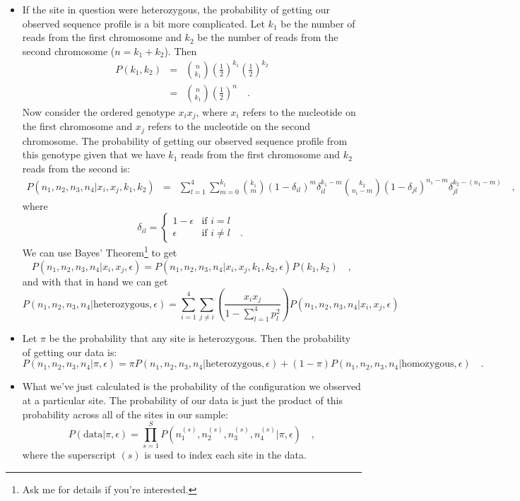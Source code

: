 \documentclass[12pt]{article}
\begin{document}
\begin{itemize}
\item If the site in question were heterozygous, the probability of
  getting our observed sequence profile is a bit more complicated. Let
  $k_1$ be the number of reads from the first chromosome and $k_2$ be
  the number of reads from the second chromosome ($n=k_1+k_2$). Then
\begin{eqnarray*}
P(k_1,k_2)
&=&
{n \choose k_1}\left(\frac{1}{2}\right)^{k_1}
               \left(\frac{1}{2}\right)^{k_2}
\\
&=&
{n \choose k_1}\left(\frac{1}{2}\right)^n \quad .
\end{eqnarray*}
Now consider the ordered genotype $x_ix_j$, where $x_i$ refers to the
nucleotide on the first chromosome and $x_j$ refers to the nucleotide
on the second chromosome. The probability of getting our observed
sequence profile from this genotype given that we have $k_1$ reads
from the first chromosome and $k_2$ reads from the second is:
{\footnotesize
\begin{eqnarray*}
P(n_1,n_2,n_3,n_4|x_i,x_j,k_1,k_2)
&=&
\sum_{l=1}^4\sum_{m=0}^{k_1}{k_1 \choose m}(1-\delta_{il})^m\delta_{il}^{k_1-m}
{k_2 \choose n_i-m}(1-\delta_{jl})^{n_1-m}\delta_{jl}^{k_2-(n_1-m)}
\quad ,
\end{eqnarray*}
}
where 
\[
\delta_{il} = \left\{\begin{array}{ll}
1-\epsilon & \mbox{if } i = l \\
\epsilon & \mbox{if } i \ne l \quad .
\end{array}
\right.
\]
We can use Bayes' Theorem\footnote{Ask me for details if you're
  interested.} to get
\[
P(n_1,n_2,n_3,n_4|x_i,x_j,\epsilon) =
P(n_1,n_2,n_3,n_4|x_i,x_j,k_1,k_2,\epsilon)P(k_1,k_2) \quad ,
\]
and with that in hand we can get
\[
P(n_1,n_2,n_3,n_4|\mbox{heterozygous},\epsilon)
=
\sum_{i=1}^4\sum_{j\ne i}
\left(\frac{x_ix_j}{1-{\sum_{l=1}^4p_l^2}}\right) P(n_1,n_2,n_3,n_4|x_i,x_j,\epsilon) 
\]

\item Let $\pi$ be the probability that any site is heterozygous. Then
  the probability of getting our data is:
{\footnotesize
\[
P(n_1,n_2,n_3,n_4|\pi,\epsilon)
=
\pi P(n_1,n_2,n_3,n_4|\mbox{heterozygous},\epsilon)
+
(1-\pi)P(n_1,n_2,n_3,n_4|\mbox{homozygous},\epsilon) \quad .
\]
}

\item What we've just calculated is the probability of the
  configuration we observed at a particular site. The probability of
  our data is just the product of this probability across all of the
  sites in our sample:
\[
P(\mbox{data}|\pi,\epsilon) = \prod_{s=1}^S
P(n_1^{(s)},n_2^{(s)},n_3^{(s)},n_4^{(s)}|\pi,\epsilon) \quad ,
\]
where the superscript $(s)$ is used to index each site in the data.


\end{itemize}
\end{document}
